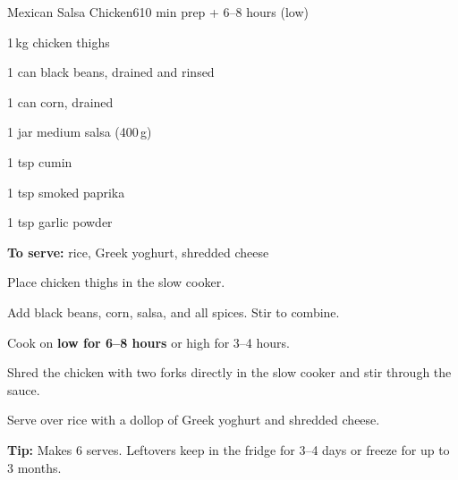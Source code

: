 \begin{recipebox}{Mexican Salsa Chicken}{6}{10 min prep + 6--8 hours (low)}
\begin{ingredients}
  \item 1\,kg chicken thighs
  \item 1 can black beans, drained and rinsed
  \item 1 can corn, drained
  \item 1 jar medium salsa (400\,g)
  \item 1 tsp cumin
  \item 1 tsp smoked paprika
  \item 1 tsp garlic powder
  \item \textbf{To serve:} rice, Greek yoghurt, shredded cheese
\end{ingredients}

\begin{method}
  \item Place chicken thighs in the slow cooker.
  \item Add black beans, corn, salsa, and all spices. Stir to combine.
  \item Cook on \textbf{low for 6--8 hours} or high for 3--4 hours.
  \item Shred the chicken with two forks directly in the slow cooker and stir through the sauce.
  \item Serve over rice with a dollop of Greek yoghurt and shredded cheese.
\end{method}

\begin{notelist}
  \item \textbf{Tip:} Makes 6 serves. Leftovers keep in the fridge for 3--4 days or freeze for up to 3 months.
\end{notelist}
\end{recipebox}
